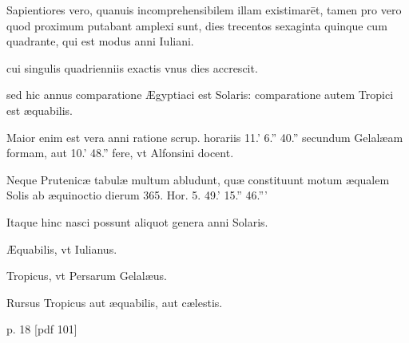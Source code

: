 \begin{parnumbers}
Sapientiores vero,
quanuis incomprehensibilem illam existimarēt, tamen pro vero quod
proximum putabant amplexi sunt, dies trecentos sexaginta quinque
cum quadrante, qui est modus anni Iuliani.

cui singulis quadrienniis
exactis vnus dies accrescit.

sed hic annus comparatione Ægyptiaci
est Solaris: comparatione autem Tropici est æquabilis.

Maior
enim est vera anni ratione scrup. horariis 11.' 6.'' 40.'' secundum
Gelalæam formam, aut 10.' 48.'' fere, vt Alfonsini docent.

Neque
Prutenicæ tabulæ multum abludunt, quæ constituunt motum
æqualem Solis ab æquinoctio dierum 365. Hor. 5. 49.' 15.'' 46.'''

Itaque hinc nasci possunt aliquot genera anni Solaris.

Æquabilis,
vt Iulianus.

Tropicus, vt Persarum Gelalæus.

Rursus Tropicus
aut æquabilis, aut cælestis.

\end{parnumbers}
\clearpage
p. 18 [pdf 101]
